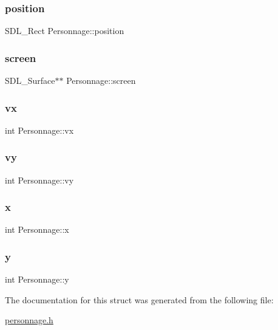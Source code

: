 \subsubsection{\texorpdfstring{position}{position}}
{\footnotesize\ttfamily S\+D\+L\+\_\+\+Rect Personnage\+::position}

\mbox{\label{structPersonnage_a467b1cc114334f7fb81ae69735d3e550}} 
\subsubsection{\texorpdfstring{screen}{screen}}
{\footnotesize\ttfamily S\+D\+L\+\_\+\+Surface$\ast$$\ast$ Personnage\+::screen}

\mbox{\label{structPersonnage_ab963d6c6eefa127548925d238119c89d}} 
\subsubsection{\texorpdfstring{vx}{vx}}
{\footnotesize\ttfamily int Personnage\+::vx}

\mbox{\label{structPersonnage_abe7e4fcd3b7657014b2f00126c506773}} 
\subsubsection{\texorpdfstring{vy}{vy}}
{\footnotesize\ttfamily int Personnage\+::vy}

\mbox{\label{structPersonnage_aed98af55dd1a3b21c5a446713061b67e}} 
\subsubsection{\texorpdfstring{x}{x}}
{\footnotesize\ttfamily int Personnage\+::x}

\mbox{\label{structPersonnage_a4fdc0728efe8d50059d81a7672c86555}} 
\subsubsection{\texorpdfstring{y}{y}}
{\footnotesize\ttfamily int Personnage\+::y}



The documentation for this struct was generated from the following file\+:\begin{DoxyCompactItemize}
\item 
\hyperlink{personnage_8h}{personnage.\+h}\end{DoxyCompactItemize}
